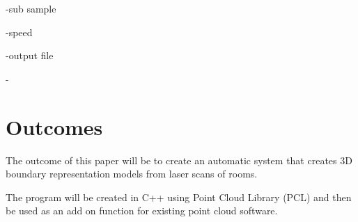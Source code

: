 -sub sample

-speed

-output file

-




\section{Outcomes}

The outcome of this paper will be to create an automatic system that creates 3D boundary representation models from laser scans of rooms. 

The program will be created in C++ using Point Cloud Library (PCL) and then be used as an add on function for existing point cloud software.







